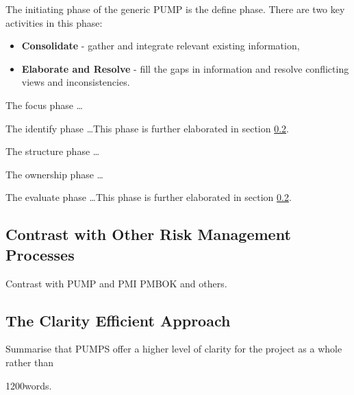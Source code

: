 The initiating phase of the generic PUMP is the define phase.
There are two key activities in this phase:
\begin{itemize}
\item \textbf{Consolidate} - gather and integrate relevant existing information,
\item \textbf{Elaborate and Resolve} - fill the gaps in information and resolve conflicting views and inconsistencies.
\end{itemize}



The focus phase \dots

The identify phase \dots This phase is further elaborated in section \ref{}.

The structure phase \dots

The ownership phase \dots

The evaluate phase \dots This phase is further elaborated in section \ref{}.

\subsection{Contrast with Other Risk Management Processes}
Contrast with PUMP and PMI PMBOK and others.

\subsection{The Clarity Efficient Approach}
Summarise that PUMPS offer a higher level of clarity for the project as a whole rather than 


1200words.